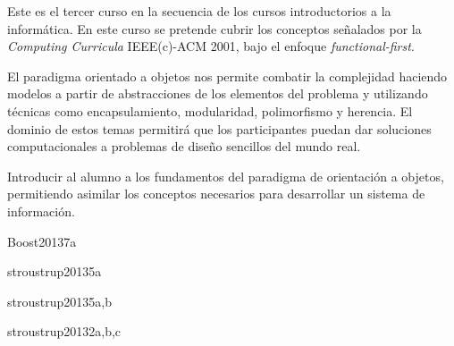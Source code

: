 \begin{syllabus}


\begin{justification}
Este es el tercer curso en la secuencia de los cursos introductorios a la informática. En este curso se pretende cubrir los conceptos señalados por la \textit{Computing Curricula} IEEE(c)-ACM 2001, bajo el enfoque \textit{functional-first}. 

El paradigma orientado a objetos nos permite combatir la
complejidad haciendo modelos a partir de abstracciones de los elementos del problema y utilizando técnicas como encapsulamiento,
modularidad, polimorfismo y herencia. El dominio de estos temas permitirá que los participantes puedan dar soluciones computacionales a problemas de diseño sencillos del mundo real.
\end{justification}

\begin{goals}
\item Introducir al alumno a los fundamentos del paradigma de orientación a objetos, permitiendo asimilar los conceptos necesarios para desarrollar un sistema de información.
\end{goals}

\begin{outcomes}
\end{outcomes}

\begin{unit}{\DSGraphsAndTreesDef}{Boost2013}{7}{a}
    \DSGraphsAndTreesAllTopics
    \DSGraphsAndTreesAllObjectives
\end{unit}

\begin{unit}{\PFFundamentalConstructsDef}{stroustrup2013}{5}{a}
    \PFFundamentalConstructsAllTopics
    \PFFundamentalConstructsAllObjectives
\end{unit}

\begin{unit}{\PFAlgorithmsAndProblemSolvingDef}{stroustrup2013}{5}{a,b}
    \PFAlgorithmsAndProblemSolvingAllTopics
    \PFAlgorithmsAndProblemSolvingAllObjectives
\end{unit}

\begin{unit}{\PFEventDrivenProgrammingDef}{stroustrup2013}{2}{a,b,c}
   \PFEventDrivenProgrammingAllTopics
   \PFEventDrivenProgrammingAllObjectives
\end{unit}


\end{syllabus}
